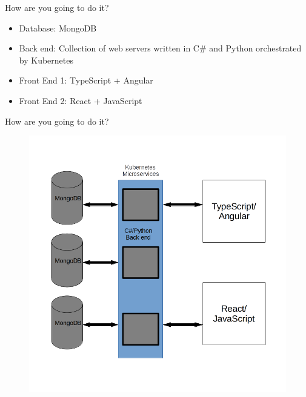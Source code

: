 \documentclass{beamer}
\begin{document}
\begin{frame}{How are you going to do it?}
    \begin{itemize}
        \item Database: MongoDB
        \item Back end: Collection of web servers written in C\# and Python orchestrated by Kubernetes
        \item Front End 1: TypeScript + Angular
        \item Front End 2: React + JavaScript
    \end{itemize}
\end{frame}

\beamerdefaultoverlayspecification{<*>}

\begin{frame}{How are you going to do it?}
    \begin{figure}
        \centering
        \includegraphics[width=0.7\linewidth]{images/Diagram.png}
    \end{figure}
\end{frame}
\end{document}
